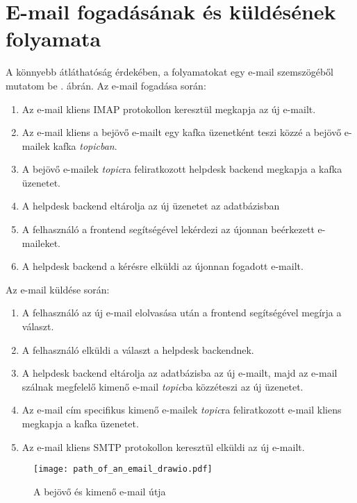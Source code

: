 \section{E-mail fogadásának és küldésének folyamata}
A könnyebb átláthatóság érdekében, a folyamatokat egy e-mail szemszögéből mutatom be . ábrán. Az e-mail fogadása során:
\begin{enumerate}
	\item Az e-mail kliens IMAP protokollon keresztül megkapja az új e-mailt.
	\item Az e-mail kliens a bejövő e-mailt egy kafka üzenetként teszi közzé a bejövő e-mailek kafka \textit{topicban}.
	\item A bejövő e-mailek \textit{topic}ra feliratkozott helpdesk backend megkapja a kafka üzenetet.
	\item A helpdesk backend eltárolja az új üzenetet az adatbázisban
	\item A felhasználó a frontend segítségével lekérdezi az újonnan beérkezett e-maileket.
	\item A helpdesk backend a kérésre elküldi az újonnan fogadott e-mailt.
\end{enumerate}

\bigskip
Az e-mail küldése során:
\begin{enumerate}
	\item A felhasználó az új e-mail elolvasása után a frontend segítségével megírja a választ.
	\item A felhasználó elküldi a választ a helpdesk backendnek.
	\item A helpdesk backend eltárolja az adatbázisba az új e-mailt, majd az e-mail szálnak megfelelő kimenő e-mail \textit{topic}ba közzéteszi az új üzenetet.
	\item Az e-mail cím specifikus kimenő e-mailek \textit{topic}ra feliratkozott e-mail kliens megkapja a kafka üzenetet.
	\item Az e-mail kliens SMTP protokollon keresztül elküldi az új e-mailt.
\end{enumerate}


\begin{figure}[hbt] 
	\centering
	\texttt{[image: path\_of\_an\_email\_drawio.pdf]}
	\caption{A bejövő és kimenő e-mail útja}
	\label{fig:path_of_an_email}
\end{figure}
